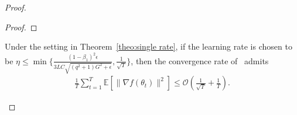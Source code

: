 \documentclass[11pt]{article}
\begin{document}
\begin{proof}
\begin{proof}
\end{proof}

\begin{Corollary} \label{coro:single rate}
Under the setting in Theorem~\ref{theo:single rate}, if the learning rate is chosen to be $\eta\leq \min\{\frac{(1-\beta_1)^2\epsilon}{3LC\sqrt{(q^2+1)G^2+\epsilon}}, \frac{1}{\sqrt T}\}$, then the convergence rate of \algo\ admits
\begin{align*}
    \frac{1}{T}\sum_{t=1}^T \mathbb E[\|\nabla f(\theta_t)\|^2]\leq \mathcal O(\frac{1}{\sqrt T}+\frac{1}{T}).
\end{align*}
\end{Corollary}



%
%
%

\end{proof}
\end{document}
